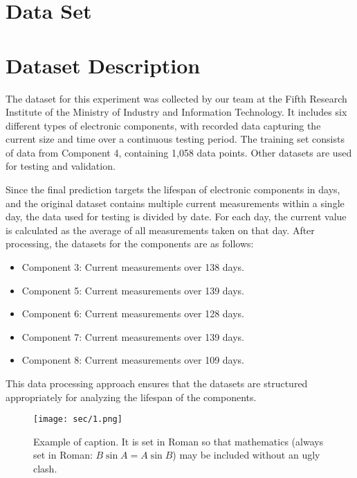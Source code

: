 \section{Data Set}
\label{sec:dataset}
\section{Dataset Description}

The dataset for this experiment was collected by our team at the Fifth Research Institute of the Ministry of Industry and Information Technology. It includes six different types of electronic components, with recorded data capturing the current size and time over a continuous testing period. The training set consists of data from Component 4, containing 1,058 data points. Other datasets are used for testing and validation.

Since the final prediction targets the lifespan of electronic components in days, and the original dataset contains multiple current measurements within a single day, the data used for testing is divided by date. For each day, the current value is calculated as the average of all measurements taken on that day. After processing, the datasets for the components are as follows:
\begin{itemize}
    \item Component 3: Current measurements over 138 days.
    \item Component 5: Current measurements over 139 days.
    \item Component 6: Current measurements over 128 days.
    \item Component 7: Current measurements over 139 days.
    \item Component 8: Current measurements over 109 days.
\end{itemize}

This data processing approach ensures that the datasets are structured appropriately for analyzing the lifespan of the components.

\begin{figure}[H]
  \centering
     \texttt{[image: sec/1.png]} %

   \caption{Example of caption.
   It is set in Roman so that mathematics (always set in Roman: $B \sin A = A \sin B$) may be included without an ugly clash.}
   \label{fig:onecol}
\end{figure}

